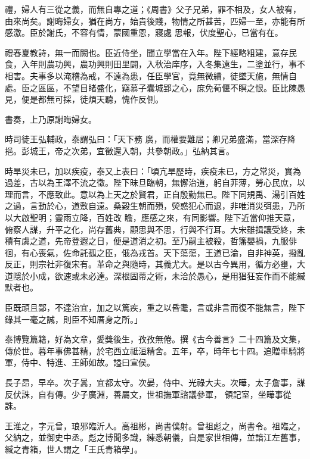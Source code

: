 \begin{pinyinscope}
 禮，婦人有三從之義，而無自專之道；《周書》父子兄弟，罪不相及，女人被宥，由來尚矣。謝晦婦女，猶在尚方，始貴後賤，物情之所甚苦，匹婦一至，亦能有所感激。臣於謝氏，不容有情，蒙國重恩，寢處
 思報，伏度聖心，已當有在。



 禮春夏教詩，無一而闕也。臣近侍坐，聞立學當在入年。陛下經略粗建，意存民食，入年則農功興，農功興則田里闢，入秋治庠序，入冬集遠生，二塗並行，事不相害。夫事多以淹稽為戒，不遠為患，任臣學官，竟無微績，徒墜天施，無情自處。臣之區區，不望目睹盛化，竊慕子囊城郢之心，庶免荀偃不瞑之恨。臣比陳愚見，便是都無可採，徒煩天聽，愧作反側。



 書奏，上乃原謝晦婦女。



 時司徒王弘輔政，泰謂弘曰：「天下務
 廣，而權要難居；卿兄弟盛滿，當深存降挹。彭城王，帝之次弟，宜徵還入朝，共參朝政。」弘納其言。



 時旱災未已，加以疾疫，泰又上表曰：「頃亢旱歷時，疾疫未已，方之常災，實為過差，古以為王澤不流之徵。陛下昧旦臨朝，無懈治道，躬自菲薄，勞心民庶，以理而言，不應致此。意以為上天之於賢君，正自殷勤無已。陛下同規禹、湯引百姓之過，言動於心，道敷自遠。桑穀生朝而殞，熒惑犯心而退，非唯消災弭患，乃所以大啟聖明；靈雨立降，百姓改
 瞻，應感之來，有同影響。陛下近當仰推天意，俯察人謀，升平之化，尚存舊典，顧思與不思，行與不行耳。大宋雖揖讓受終，未積有虞之道，先帝登遐之日，便是道消之初。至乃嗣主被殺，哲籓嬰禍，九服俳徊，有心喪氣，佐命託孤之臣，俄為戎首。天下蕩蕩，王道已淪，自非神英，撥亂反正，則宗社非復宋有。革命之與隨時，其義尤大。是以古今異用，循方必壅，大道隱於小成，欲速或未必達。深根固蒂之術，未洽於愚心，是用猖狂妄作而不能緘
 默者也。



 臣既頑且鄙，不達治宜，加之以篤疾，重之以昏耄，言或非言而復不能無言，陛下錄其一毫之誠，則臣不知厝身之所。」



 泰博覽篇籍，好為文章，愛獎後生，孜孜無倦。撰《古今善言》二十四篇及文集，傳於世。暮年事佛甚精，於宅西立祗洹精舍。五年，卒，時年七十四。追贈車騎將軍，侍中、特進、王師如故。謚曰宣侯。



 長子昂，早卒。次子暠，宜都太守。次晏，侍中、光祿大夫。次曄，太子詹事，謀反伏誅，自有傳。少子廣淵，善屬文，世祖撫軍諮議參軍，
 領記室，坐曄事從誅。



 王淮之，字元曾，琅邪臨沂人。高祖彬，尚書僕射。曾祖彪之，尚書令。祖臨之，父納之，並御史中丞。彪之博聞多識，練悉朝儀，自是家世相傳，並諳江左舊事，緘之青箱，世人謂之「王氏青箱學」。




\end{pinyinscope}
